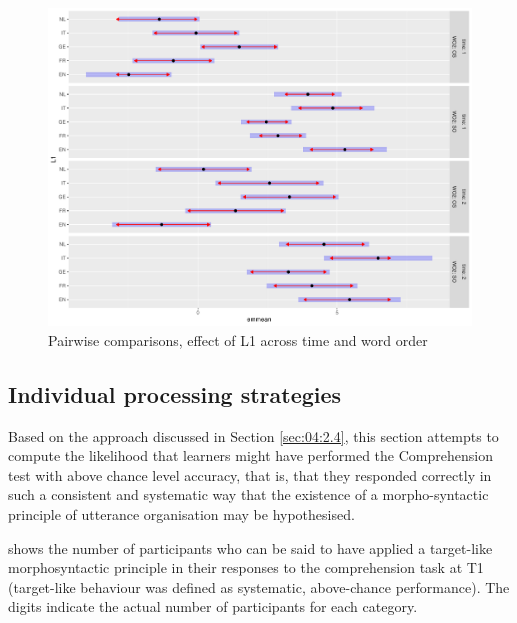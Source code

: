 \begin{figure}
    \includegraphics[width=\textwidth]{figures/05-4.pdf}
    \caption{Pairwise comparisons, effect of L1 across time and word order}
    \label{fig:05:4}
\end{figure}

\subsection{Individual processing strategies}\label{sec:05:2.3}

Based on the approach discussed in Section \ref{sec:04:2.4}, this section attempts to compute the likelihood that learners might have performed the Comprehension test with above chance level accuracy, that is, that they responded correctly in such a consistent and systematic way that the existence of a morpho-syntactic principle of utterance organisation may be hypothesised. 

 shows the number of participants who can be said to have applied a target-like morphosyntactic principle in their responses to the comprehension task at T1 (target-like behaviour was defined as systematic, above-chance performance). The digits indicate the actual number of participants for each category.

